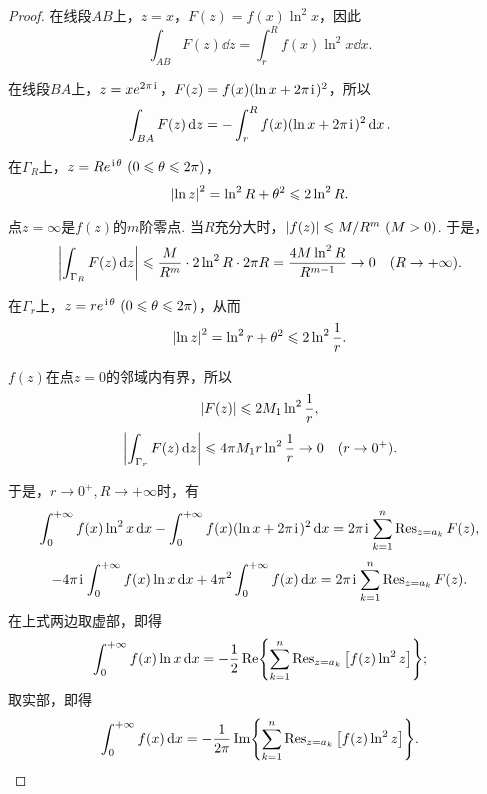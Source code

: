\begin{theorem}
\begin{proof}
在线段\(AB\)上，\(z=x\)，\(F(z) = f(x) \ln^2 x\)，因此\[
\int_{AB} F(z) \dd{z}
= \int_r^R f(x) \ln^2 x \dd{x}.
\]

在线段\(BA\)上，\(z = x e^{2\pi\kern1pt\mathrm{i}\kern1pt}\)，\(F(z) = f(x) (\ln x + 2\pi\kern1pt\mathrm{i}\kern1pt)^2\)，所以\[
\int_{BA} F(z) \dd{z}
= -\int_r^R f(x) (\ln x + 2\pi\kern1pt\mathrm{i}\kern1pt)^2 \dd{x}.
\]

在\(\Gamma_R\)上，\(z = R e^{\iu\theta}\ (0\leqslant\theta\leqslant2\pi)\)，\[
\abs{\ln z}^2 = \ln^2 R + \theta^2 \leqslant 2 \ln^2 R.
\]

点\(z=\infty\)是\(f(z)\)的\(m\)阶零点.
当\(R\)充分大时，\(\abs{f(z)} \leqslant M/R^m\ (M>0)\).
于是，\[
\abs{\int_{\Gamma_R} F(z) \dd{z}}
\leqslant \frac{M}{R^m} \cdot 2 \ln^2 R \cdot 2\pi R
= \frac{4M \ln^2 R}{R^{m-1}} \to 0 \quad(R\to+\infty).
\]

在\(\Gamma_r\)上，\(z = r e^{\iu\theta}\ (0\leqslant\theta\leqslant2\pi)\)，从而\[
\abs{\ln z}^2 = \ln^2 r + \theta^2
\leqslant 2 \ln^2 \frac{1}{r}.
\]

\(f(z)\)在点\(z=0\)的邻域内有界，所以\[
\abs{F(z)} \leqslant 2M_1 \ln^2 \frac{1}{r},
\]\[
\abs{\int_{\Gamma_r} F(z) \dd{z}}
\leqslant 4\pi M_1 r \ln^2 \frac{1}{r}
\to 0 \quad(r\to0^+).
\]

于是，\(r\to0^+, R\to+\infty\)时，有\[
\int_0^{+\infty} f(x) \ln^2 x \dd{x}
- \int_0^{+\infty} f(x) (\ln x + 2\pi\kern1pt\mathrm{i}\kern1pt)^2 \dd{x}
= 2\pi\kern1pt\mathrm{i}\kern1pt \sum\limits_{k=1}^n \operatorname{Res}_{z=a_k} F(z),
\]\[
-4\pi\kern1pt\mathrm{i}\kern1pt \int_0^{+\infty} f(x) \ln x \dd{x}
+ 4\pi^2 \int_0^{+\infty} f(x) \dd{x}
= 2\pi\kern1pt\mathrm{i}\kern1pt \sum\limits_{k=1}^n \operatorname{Res}_{z=a_k} F(z).
\]
在上式两边取虚部，即得\begin{equation}\label{equation:留数定理.利用留数定理计算实积分4.2}
\int_0^{+\infty} f(x) \ln x \dd{x}
= -\frac{1}{2} \Re{ \sum\limits_{k=1}^n \operatorname{Res}_{z=a_k} \left[ f(z) \ln^2 z \right] };
\end{equation}
取实部，即得\begin{equation}\label{equation:留数定理.利用留数定理计算实积分4.3}
\int_0^{+\infty} f(x) \dd{x}
= -\frac{1}{2\pi} \Im{ \sum\limits_{k=1}^n \operatorname{Res}_{z=a_k} \left[ f(z) \ln^2 z \right] }.
\end{equation}
\end{proof}
\end{theorem}

